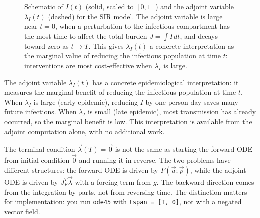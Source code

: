\begin{figure}[htb]
\centering
{}
\caption{Schematic of $I(t)$ (solid, scaled to $[0,1]$) and the adjoint
         variable $\lambda_I(t)$ (dashed) for the SIR model.
         The adjoint variable is large near $t=0$, when a perturbation
         to the infectious compartment has the most time to affect the
         total burden $J = \int I\,dt$, and decays toward zero as
         $t \to T$.
         This gives $\lambda_I(t)$ a concrete interpretation as the
         marginal value of reducing the infectious population at time $t$:
         interventions are most cost-effective when $\lambda_I$ is large.}
\label{fig:sir_lambdaI}
\end{figure}

The adjoint variable $\lambda_I(t)$ has a concrete epidemiological
interpretation: it measures the marginal benefit of reducing the
infectious population at time $t$.
When $\lambda_I$ is large (early epidemic), reducing $I$ by one
person-day saves many future infections.
When $\lambda_I$ is small (late epidemic), most transmission has
already occurred, so the marginal benefit is low.
This interpretation is available from the adjoint computation alone,
with no additional work.

The terminal condition $\vec{\lambda}(T) = \vec{0}$ is not the same
as starting the forward ODE from initial condition $\vec{0}$ and running it
in reverse. The two problems have different structures: the forward
ODE is driven by $F(\vec{u}; \vec{p})$, while the adjoint ODE
is driven by $J_F^T \vec{\lambda}$ with a forcing term from $g$.
The backward direction comes from the integration by parts, not from
reversing time. The distinction matters for implementation: you run
\texttt{ode45} with \texttt{tspan = [T, 0]}, not with a negated vector field.

